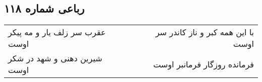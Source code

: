 \begin{center}
\section*{رباعی شماره ۱۱۸}
\label{sec:sh118}
\begin{longtable}{l p{0.5cm} r}
عقرب سر زلف یار و مه پیکر اوست
&&
با این همه کبر و ناز کاندر سر اوست
\\
شیرین دهنی و شهد در شکر اوست
&&
فرمانده روزگار فرمانبر اوست
\\
\end{longtable}
\end{center}

